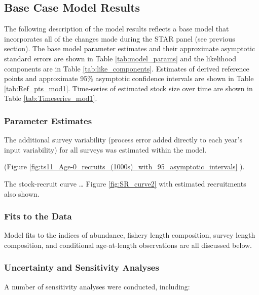 \documentclass[12pt,]{article}
\begin{document}
\hypertarget{base-case-model-results}{%
\subsection{Base Case Model Results}\label{base-case-model-results}}

The following description of the model results reflects a base model
that incorporates all of the changes made during the STAR panel (see
previous section). The base model parameter estimates and their
approximate asymptotic standard errors are shown in Table
\ref{tab:model_params} and the likelihood components are in Table
\ref{tab:like_components}. Estimates of derived reference points and
approximate 95\% asymptotic confidence intervals are shown in Table
\ref{tab:Ref_pts_mod1}. Time-series of estimated stock size over time
are shown in Table \ref{tab:Timeseries_mod1}.

\hypertarget{parameter-estimates}{%
\subsubsection{Parameter Estimates}\label{parameter-estimates}}

The additional survey variability (process error added directly to each
year's input variability) for all surveys was estimated within the
model.

(Figure
\ref{fig:ts11_Age-0_recruits_(1000s)_with_95_asymptotic_intervals} ).

The stock-recruit curve \ldots{} Figure \ref{fig:SR_curve2} with
estimated recruitments also shown.

\hypertarget{fits-to-the-data}{%
\subsubsection{Fits to the Data}\label{fits-to-the-data}}

Model fits to the indices of abundance, fishery length composition,
survey length composition, and conditional age-at-length observations
are all discussed below.

\hypertarget{uncertainty-and-sensitivity-analyses}{%
\subsubsection{Uncertainty and Sensitivity
Analyses}\label{uncertainty-and-sensitivity-analyses}}

A number of sensitivity analyses were conducted, including:
\end{document}
